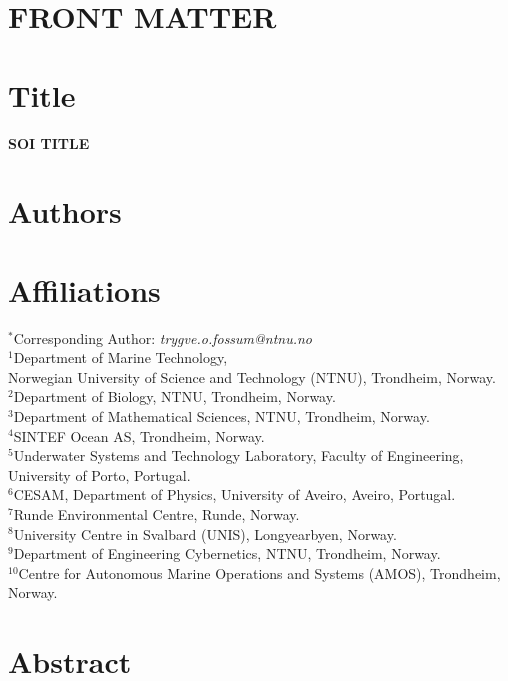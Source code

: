 \documentclass[12pt]{article}
\begin{document}
\section*{FRONT MATTER}

\section*{Title}
\textbf{SOI TITLE}

\section*{Authors}

\section*{Affiliations}
$^{*}$Corresponding Author: \emph{trygve.o.fossum@ntnu.no}\\
\noindent
$^{1}$Department of Marine Technology,\\ Norwegian University of Science and Technology (NTNU), Trondheim, Norway.\\
\noindent
$^{2}$Department of Biology, NTNU, Trondheim, Norway.\\
\noindent
$^{3}$Department of Mathematical Sciences, NTNU, Trondheim, Norway.\\
\noindent
$^{4}$SINTEF Ocean AS, Trondheim, Norway.\\
\noindent
$^{5}$Underwater Systems and Technology Laboratory, Faculty of Engineering,\\ University of Porto, Portugal.\\
\noindent
$^{6}$CESAM, Department of Physics, University of Aveiro, Aveiro, Portugal.\\
\noindent
$^{7}$Runde Environmental Centre, Runde, Norway.\\
\noindent
$^{8}$University Centre in Svalbard (UNIS), Longyearbyen, Norway.\\
\noindent
$^{9}$Department of Engineering Cybernetics, NTNU, Trondheim, Norway.\\
\noindent
$^{10}$Centre for Autonomous Marine Operations and Systems (AMOS), Trondheim, Norway.\\


\section*{Abstract}
\end{document}
